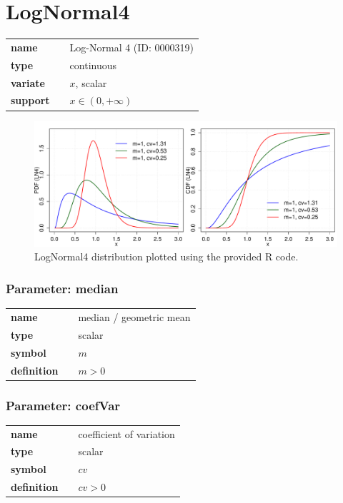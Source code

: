 \section*{LogNormal4} 

  \bigskip 

\begin{tabular}{p{2cm}cl}
\textbf{name} & & Log-Normal 4 (ID: 0000319)\\ 
 
\textbf{type} & & continuous \\ 

\textbf{variate} & & $x$, scalar \\ 

\textbf{support} & & $x \in (0,+\infty)$
\end{tabular}

\begin{figure}[ht!]
\centering
  \includegraphics[width=140mm]{pics/LogNormal4.pdf}
 \caption{LogNormal4 distribution plotted using the provided R code.}
 \label{fig:LogNormal4}
\end{figure}

\subsubsection*{Parameter: median}

\noindent\begin{tabular}{p{2cm}cl}
\textbf{name} & & median / geometric mean \\
\textbf{type} & & scalar \\
\textbf{symbol} & & $m$  \\
\textbf{definition} & & $m>0$
\end{tabular}
\subsubsection*{Parameter: coefVar}

\noindent\begin{tabular}{p{2cm}cl}
\textbf{name} & & coefficient of variation \\
\textbf{type} & & scalar \\
\textbf{symbol} & & $cv$  \\
\textbf{definition} & & $cv>0$
\end{tabular}
